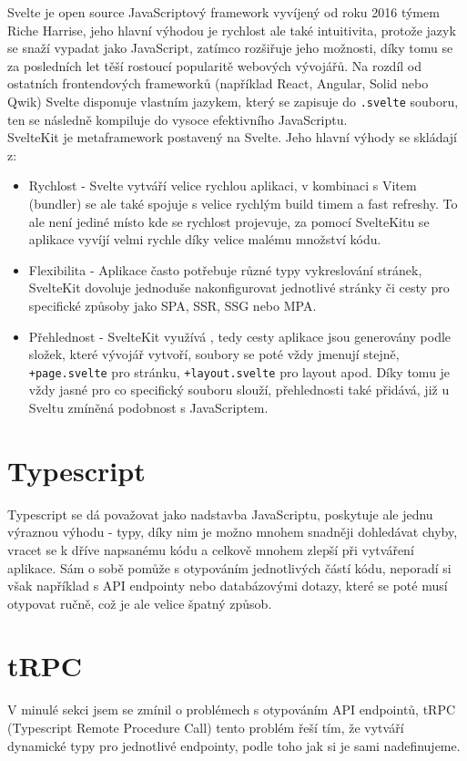 \documentclass[12pt, a4paper,
openright
]{report}
\begin{document}
Svelte je open source JavaScriptový framework vyvíjený od roku 2016 týmem Riche Harrise, jeho hlavní výhodou je rychlost ale také intuitivita, protože jazyk se snaží vypadat jako JavaScript, zatímco rozšiřuje jeho možnosti, díky tomu se za posledních let těší rostoucí popularitě webových vývojářů. Na rozdíl od ostatních frontendových frameworků (například React, Angular, Solid nebo Qwik) Svelte disponuje vlastním jazykem, který se zapisuje do \texttt{.svelte} souboru, ten se následně kompiluje do vysoce efektivního JavaScriptu.\\

SvelteKit je metaframework postavený na Svelte. Jeho hlavní výhody se skládají z:
\begin{itemize}
	\item Rychlost - Svelte vytváří velice rychlou aplikaci, v kombinaci s Vitem (bundler) se ale také spojuje s velice rychlým build timem a fast refreshy. To ale není jediné místo kde se rychlost projevuje, za pomocí SvelteKitu se aplikace vyvíjí velmi rychle díky velice malému množství  kódu.
	\item Flexibilita - Aplikace často potřebuje různé typy vykreslování stránek, SvelteKit dovoluje jednoduše nakonfigurovat jednotlivé stránky či cesty pro specifické způsoby jako SPA, SSR, SSG nebo MPA.
	\item Přehlednost - SvelteKit využívá , tedy cesty aplikace jsou generovány podle složek, které vývojář vytvoří, soubory se poté vždy jmenují stejně, \texttt{+page.svelte} pro stránku, \texttt{+layout.svelte} pro layout apod. Díky tomu je vždy jasné pro co specifický souboru slouží, přehlednosti také přidává, již u Sveltu zmíněná podobnost s JavaScriptem.
\end{itemize} 

\section{Typescript}
Typescript se dá považovat jako nadstavba JavaScriptu, poskytuje ale jednu výraznou výhodu - typy, díky nim je možno mnohem snadněji dohledávat chyby, vracet se k dříve napsanému kódu a celkově mnohem zlepší  při vytváření aplikace. Sám o sobě pomůže s otypováním jednotlivých částí kódu, neporadí si však například s API endpointy nebo databázovými dotazy, které se poté musí otypovat ručně, což je ale velice špatný způsob.

\section{tRPC}
V minulé sekci jsem se zmínil o problémech s otypováním API endpointů, tRPC (Typescript Remote Procedure Call) tento problém řeší tím, že vytváří dynamické typy pro jednotlivé endpointy, podle toho jak si je sami nadefinujeme.
\end{document}
